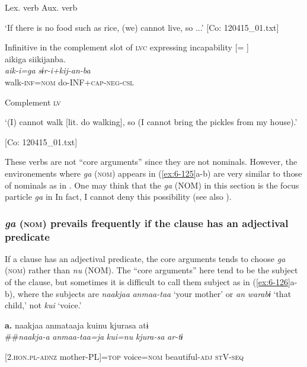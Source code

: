 \begin{table}
\begin{styleBeschriftung}
        Lex. verb  Aux. verb

\glt    ‘If there is no food such as rice, (we) cannot live, so ...’ [Co: 120415\_01.txt]
\z

\ex Infinitive in the complement slot of \textsc{lvc} expressing incapability [= ]\\

{\TM}
\glll aikiga  siikijanba.\\
\textit{aik-i=ga}  \textit{sɨr-i+kij-an-ba}\\

    walk-\textsc{inf}=\textsc{nom}  do-INF+\textsc{cap}-\textsc{neg}-\textsc{csl}

    Complement  \textsc{lv}

\glt    ‘(I) cannot walk [lit. do walking], so (I cannot bring the pickles from my house).’

  [Co: 120415\_01.txt]
\z

These verbs are not “core arguments” since they are not nominals. However, the environements where \textit{ga} (\textsc{nom}) appears in (\ref{ex:6-125}a-b) are very similar to those of nominals as in . One may think that the \textit{ga} (NOM) in this section is the focus particle \textit{ga} in  In fact, I cannot deny this possibility (see also ).

\subsubsection{\textit{ga} (\textsc{nom}) prevails frequently if the clause has an adjectival predicate}

If a clause has an adjectival predicate, the core arguments tends to choose \textit{ga} (\textsc{nom}) rather than \textit{nu} (NOM). The “core arguments” here tend to be the subject of the clause, but sometimes it is difficult to call them subject as in (\ref{ex:6-126}a-b), where the subjects are \textit{naakjaa} \textit{anmaa-taa} ‘your mother’ or \textit{an} \textit{warabɨ} ‘that child,’ not \textit{kui} ‘voice.’

\ea\label{ex:6-126}
 \textbf{a.}  {\TM}  naakjaa  anmataaja  kuinu  kjurasa  atɨ\\##\textit{naakja-a}  \textit{anmaa-taa=ja}  \textit{kui=nu}  \textit{kjura-sa}  \textit{ar-tɨ}

      [2.\textsc{hon}.\textsc{pl}-\textsc{adnz}  mother-PL]=\textsc{top}  voice=\textsc{nom}  beautiful-\textsc{adj}  \textsc{st}V-\textsc{seq}


\end{styleBeschriftung}
\end{table}
